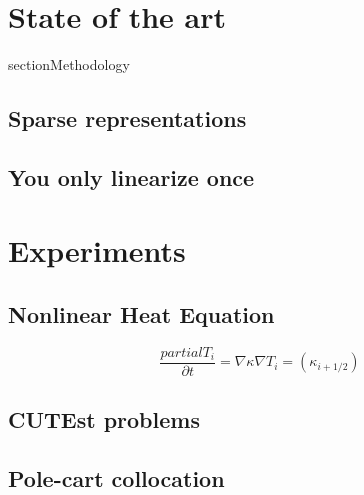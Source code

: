 \documentclass{article}
\begin{document}
\section{State of the art}

section{Methodology}

\subsection{Sparse representations}

\subsection{You only linearize once}

\section{Experiments}

\subsection{Nonlinear Heat Equation}

\begin{equation}
\frac{partial T_i }{\partial t} = \nabla \kappa \nabla T_i = (\kappa_{i+1/2})
\end{equation}


\subsection{CUTEst problems}

\subsection{Pole-cart collocation}
\end{document}
